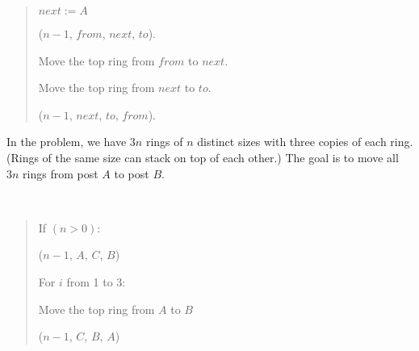 \documentclass[10pt]{article}
\begin{document}
\begin{solution}
\begin{quote}
\begin{steps}
\begin{steps}
          \begin{steps}
          \item \(next := A\)
          \end{steps}
      \item {}(\( n - 1 \), \( from \), \( next \), \( to \)).
      \item Move the top ring from \( from \) to \( next \).
      \item Move the top ring from \( next \) to \( to \).
      \item {}(\( n - 1 \), \( next \), \( to \), \( from \)).
      \end{steps}
    \end{steps}
  \end{quote}
\end{solution}
\pagebreak

In the  problem, we have \( 3n \) rings of \( n \) distinct sizes with three copies of each ring. (Rings of the same size can stack on top of each other.) The goal is to move all \( 3n \) rings from post \( A \) to post \( B \).

\begin{solution}\ %
\begin{quote}
\noindent{}%

%

\begin{steps}
  \item If \( (n > 0) \):
  \begin{steps}
    \item {}(\( n-1 \), \( A \), \( C \), \( B \))

    \item For \( i \) from 1 to 3:
    \begin{steps}
      \item Move the top ring from \( A \) to \( B \)
    \end{steps}
    \item {}(\( n-1 \), \( C \), \( B \), \( A \))
  \end{steps}
\end{steps}
\end{quote}
\end{solution}
\pagebreak
\end{document}
